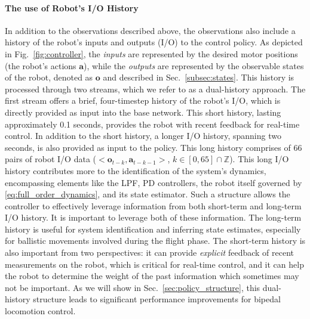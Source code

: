 \paragraph{The use of Robot's I/O History} 
In addition to the observations described above, the observations also include a history of the robot's inputs and outputs (I/O) to the control policy. 
As depicted in Fig.~\ref{fig:controller}, the \emph{inputs} are represented by the desired motor positions (the robot's actions $\mathbf{a}$), while the \emph{outputs} are represented by the observable states of the robot, denoted as $\mathbf{o}$ and described in Sec.~\ref{subsec:states}.
This history is processed through two streams, which we refer to as a dual-history approach. 
The first stream offers a brief, four-timestep history of the robot's I/O, which is directly provided as input into the base network. 
This short history, lasting approximately 0.1 seconds, provides the robot with recent feedback for real-time control.
In addition to the short history, a longer I/O history, spanning two seconds, is also provided as input to the policy. This long history comprises of 66 pairs of robot I/O data ($<\mathbf{o}_{t-k}, \mathbf{a}_{t-k-1}>$, $k\in[0,65] \cap \mathbb{Z}$). 
This long I/O history contributes more to the identification of the system's dynamics, encompassing elements like the LPF, PD controllers, the robot itself governed by \eqref{eq:full_order_dynamics}, and its state estimator.
Such a structure allows the controller to effectively leverage information from both short-term and long-term I/O history. 
It is important to leverage both of these information. 
The long-term history is useful for system identification and inferring state estimates, especially for ballistic movements involved during the flight phase. 
The short-term history is also important from two perspectives: it can provide \emph{explicit} feedback of recent measurements on the robot, which is critical for real-time control, and it can help the robot to determine the weight of the past information which sometimes may not be important.
As we will show in Sec.~\ref{sec:policy_structure}, this dual-history structure leads to significant performance improvements for bipedal locomotion control. 




